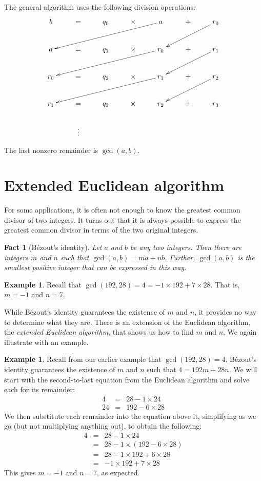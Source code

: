 \documentclass{book}
\theoremstyle{plain}
\newtheorem{fact}[theorem]{Fact}
\theoremstyle{definition}
\newtheorem{example}[theorem]{Example}
\begin{document}
The general algorithm uses the following division operations:
$$\xymatrix{ b & = & q_0 & \times & a \ar[dllll] & + & r_0 \ar[dll] \\
a & = & q_1 & \times & r_0 \ar[dllll] & + & r_1 \ar[dll] \\
r_0 & = & q_2 & \times & r_1 \ar[dllll] & + & r_2 \ar[dll] \\
r_1 & = & q_3 & \times & r_2 & + & r_3 \\
& \vdots }$$

The last nonzero remainder is $\gcd(a,b)$.

\section{Extended Euclidean algorithm}
For some applications, it is often not enough to know the greatest common divisor of two integers. It turns out that it is always possible to express the greatest common divisor in terms of the two original integers.

\begin{fact}[B\'{e}zout's identity]
Let $a$ and $b$ be any two integers. Then there are integers $m$ and $n$ such that $\gcd(a,b) = ma+nb$. Further, $\gcd(a,b)$ is the smallest positive integer that can be expressed in this way.
\end{fact}

\begin{example}
Recall that $\gcd(192,28) = 4 = -1 \times 192 + 7 \times 28$. That is, $m = -1$ and $n = 7$.
\end{example}

While B\'{e}zout's identity guarantees the existence of $m$ and $n$, it provides no way to determine what they are. There is an extension of the Euclidean algorithm, the {\it extended Euclidean algorithm}, that shows us how to find $m$ and $n$. We again illustrate with an example.

\begin{example}
Recall from our earlier example that $\gcd(192,28) = 4$. B\'{e}zout's identity guarantees the existence of $m$ and $n$ such that $4 = 192m + 28n$. We will start with the second-to-last equation from the Euclidean algorithm and solve each for its remainder:
\begin{eqnarray*}
4 &=& 28 - 1 \times 24 \\
24 &=& 192 - 6 \times 28
\end{eqnarray*}
We then substitute each remainder into the equation above it, simplifying as we go (but not multiplying anything out), to obtain the following:
\begin{eqnarray*}
4 &=&  28 - 1 \times 24 \\
&=& 28 - 1 \times ( 192 - 6 \times 28 ) \\
&=& 28 - 1 \times 192 + 6 \times 28 \\
&=& -1 \times 192 + 7 \times 28
\end{eqnarray*}
This gives $m = -1$ and $n = 7$, as expected.
\end{example}
\end{document}
